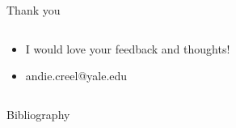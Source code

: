 \documentclass[notes,11pt, aspectratio=169]{beamer}
\begin{document}

\begin{frame}{Thank you }

\begin{columns}[T] %
\begin{column}{.9\textwidth}
\begin{itemize}
    \item I would love your feedback and thoughts!  
    \item andie.creel@yale.edu
\end{itemize}
 
 
\end{column}%
\hfill%
\begin{column}{.38\textwidth}
  \makebox[\linewidth][c]{
    \resizebox{\linewidth}{!}{
    }
  }
\end{column}%
\end{columns}
\end{frame}


\usebackgroundtemplate{}
\begin{frame}{Bibliography}
    \fontsize{7pt}{7pt}\selectfont
  
\end{frame}
\end{document}
